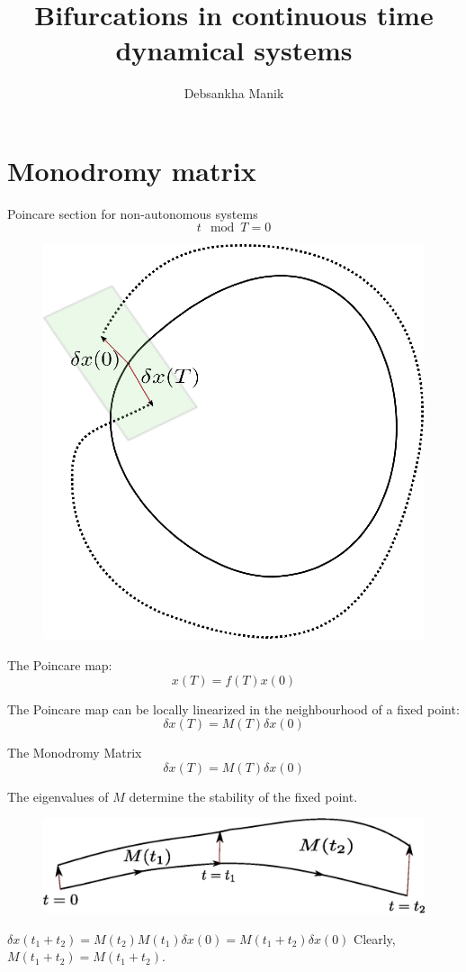\documentclass[xcolor=x11names,compress]{beamer}
\renewcommand{\(}{\begin{columns}}
\renewcommand{\)}{\end{columns}}
\newcommand{\<}[1]{\begin{column}{#1}}
\renewcommand{\>}{\end{column}}
\begin{document}
\title{Bifurcations in continuous time dynamical systems}
\author{Debsankha Manik}

\begin{frame}


\titlepage

\end{frame}
\section{Monodromy matrix}
\begin{frame}{Poincare section for non-autonomous systems}
\[
t\mod{T}=0
\]
\begin{figure}
\begin{center}
\includegraphics[width=0.28\columnwidth]{monodromy}
\end{center}
\end{figure}

The Poincare map:
\[
x(T)=f(T)x(0)
\]


The Poincare map can be locally linearized in the neighbourhood of a fixed point:
\[
\delta x(T)=M(T)\delta x(0)
\]
\end{frame}

\begin{frame}{The Monodromy Matrix}
\[
\delta x(T)=M(T)\delta x(0)
\]

The eigenvalues of $M$ determine the stability of the fixed point.   
\begin{figure}
\begin{center}
\includegraphics[width=0.9\columnwidth]{multiplicity}
\end{center}
\end{figure}


$\delta x(t_1+t_2)=M(t_2)M(t_1)\delta x(0)=M(t_1+t_2)\delta x(0)$
Clearly, $M(t_1+t_2)=M(t_1+t_2)$.  

\end{frame}
\end{document}

